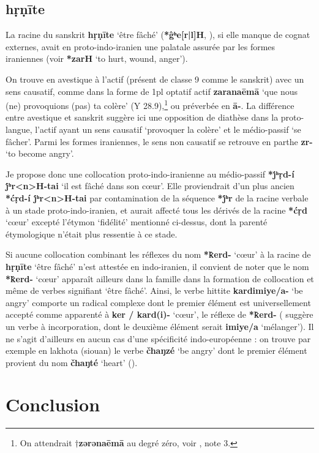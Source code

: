 \documentclass{article}
\newcommand{\ipa}[1]{{\phon\textbf{#1}}}
\begin{document}
\subsection{\ipa{hṛṇīte}} \label{sec:hrnite}
La racine du sanskrit \ipa{hṛṇīte} `être fâché' (\ipa{*ĝʰe[r|l]H}, \citealt[178]{liv}), si elle manque de cognat externes, avait en proto-indo-iranien une palatale assurée par les formes iraniennes (voir \citealt[469]{cheung07dictionary} \ipa{*zarH} ‘to hurt, wound, anger’). 

On trouve en avestique à l'actif (présent de classe 9 comme le sanskrit) avec un sens causatif, comme dans la forme de 1pl optatif actif \ipa{zaranaēmā} `que nous (ne) provoquions (pas) ta colère' (Y 28.9),\footnote{On attendrait $\dagger$\ipa{zərənaēmā} au degré zéro, voir \citet[178]{liv}, note 3.  } ou préverbée en \ipa{ā-}. La différence entre avestique et sanskrit suggère ici une opposition de diathèse dans la proto-langue, l'actif ayant un sens causatif `provoquer la colère' et le médio-passif `se fâcher'. Parmi les formes iraniennes, le sens non causatif se retrouve en parthe \ipa{zr-} `to become angry'.


Je propose donc une collocation proto-indo-iranienne au médio-passif \ipa{*j́ʰṛd-í j́ʰr<n>H-tai} `il est fâché dans son cœur'. Elle proviendrait d'un plus ancien \ipa{*ćṛd-í j́ʰr<n>H-tai} par contamination de la séquence \ipa{*j́ʰr} de la racine verbale à un stade proto-indo-iranien, et aurait affecté tous les dérivés de la racine \ipa{*ćṛd} `cœur' excepté l'étymon `fidélité' mentionné ci-dessus, dont la parenté étymologique n'était plus ressentie à ce stade.

Si aucune collocation combinant les réflexes du nom \ipa{*k̂erd-} `cœur' à la racine de \ipa{hṛṇīte} `être fâché' n'est attestée en indo-iranien, il convient de noter que  le nom \ipa{*k̂erd-} `cœur' apparaît ailleurs dans la famille dans  la formation de collocation et même de verbes signifiant `être fâché'. Ainsi, le verbe hittite  \ipa{kardimiye/a-} `be angry' comporte un radical complexe dont le premier élément est universellement accepté comme apparenté à \ipa{ker / kard(i)-} `cœur', le réflexe de \ipa{*k̂erd-} (\citealt[456-7]{kloekhorst08edhil} suggère un verbe à incorporation, dont le deuxième élément serait \ipa{imiye/a} `mélanger'). Il ne s'agit d'ailleurs en aucun cas d'une spécificité indo-européenne : on trouve par exemple en lakhota (siouan) le verbe  \ipa{čhaŋzé} `be angry' dont le premier élément provient du nom \ipa{čhaŋté} `heart' (\citealt{ullrich08}).


\section*{Conclusion}





\end{document}
